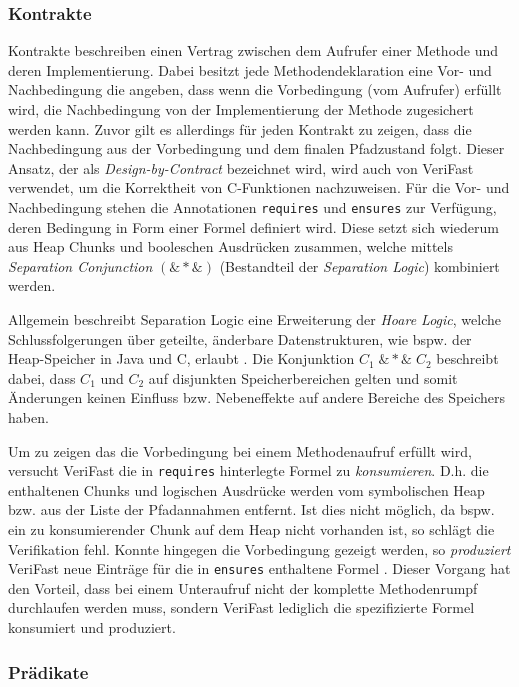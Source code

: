 \subsubsection{Kontrakte}

Kontrakte beschreiben einen Vertrag zwischen dem Aufrufer einer Methode und deren Implementierung. Dabei besitzt jede Methodendeklaration eine Vor- und Nachbedingung die angeben, dass wenn die Vorbedingung (vom Aufrufer) erfüllt wird, die Nachbedingung von der Implementierung der Methode zugesichert werden kann. Zuvor gilt es allerdings für jeden Kontrakt zu zeigen, dass die Nachbedingung aus der Vorbedingung und dem finalen Pfadzustand folgt. Dieser Ansatz, der als \emph{Design-by-Contract} bezeichnet wird, wird auch von VeriFast verwendet, um die Korrektheit von C-Funktionen nachzuweisen. Für die Vor- und Nachbedingung stehen die Annotationen \texttt{requires} und \texttt{ensures} zur Verfügung, deren Bedingung in Form einer Formel definiert wird. Diese setzt sich wiederum aus Heap Chunks und booleschen Ausdrücken zusammen, welche mittels \emph{Separation Conjunction} $(\&{*}\&)$ (Bestandteil der \emph{Separation Logic}) kombiniert werden.

Allgemein beschreibt Separation Logic eine Erweiterung der \emph{Hoare Logic}, welche Schlussfolgerungen über geteilte, änderbare Datenstrukturen, wie bspw. der Heap-Speicher in Java und C, erlaubt \cite{Reynolds2002}. Die Konjunktion $C_{1} \; \&{*}\& \; C_{2}$ beschreibt dabei, dass $C_{1}$ und $C_{2}$ auf disjunkten Speicherbereichen gelten und somit Änderungen keinen Einfluss bzw. Nebeneffekte auf andere Bereiche des Speichers haben.

Um zu zeigen das die Vorbedingung bei einem Methodenaufruf erfüllt wird, versucht VeriFast die in \texttt{requires} hinterlegte Formel zu \emph{konsumieren}. D.h. die enthaltenen Chunks und logischen Ausdrücke werden vom symbolischen Heap bzw. aus der Liste der Pfadannahmen entfernt. Ist dies nicht möglich, da bspw. ein zu konsumierender Chunk auf dem Heap nicht vorhanden ist, so schlägt die Verifikation fehl. Konnte hingegen die Vorbedingung gezeigt werden, so \emph{produziert} VeriFast neue Einträge für die in \texttt{ensures} enthaltene Formel \cite{Jacobs2017}. Dieser Vorgang hat den Vorteil, dass bei einem Unteraufruf nicht der komplette Methodenrumpf durchlaufen werden muss, sondern VeriFast lediglich die spezifizierte Formel konsumiert und produziert.

\subsubsection{Prädikate}

